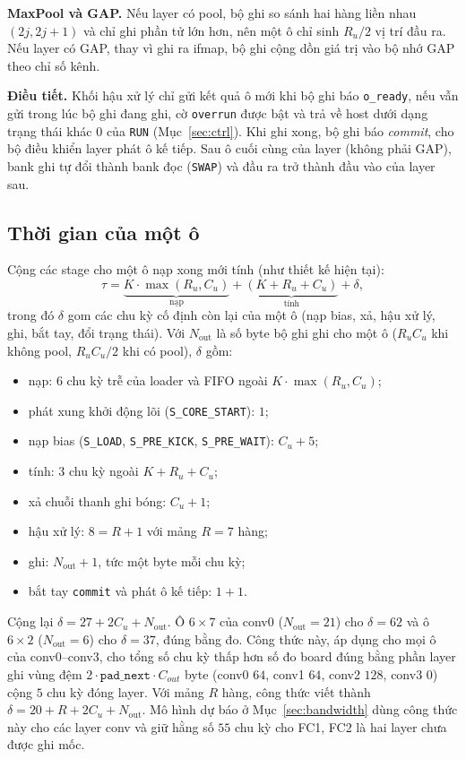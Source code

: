 \textbf{MaxPool và GAP.} Nếu layer có pool, bộ ghi so sánh hai hàng liền nhau $(2j,2j+1)$ và chỉ ghi phần tử lớn hơn, nên một ô chỉ sinh $R_u/2$ vị trí đầu ra.
Nếu layer có GAP, thay vì ghi ra ifmap, bộ ghi cộng dồn giá trị vào bộ nhớ GAP theo chỉ số kênh.

\textbf{Điều tiết.} Khối hậu xử lý chỉ gửi kết quả ô mới khi bộ ghi báo \texttt{o\_ready}, nếu vẫn gửi trong lúc bộ ghi đang ghi, cờ \texttt{overrun} được bật và trả về host dưới dạng trạng thái khác $0$ của \texttt{RUN} (Mục~\ref{sec:ctrl}).
Khi ghi xong, bộ ghi báo \emph{commit}, cho bộ điều khiển layer phát ô kế tiếp.
Sau ô cuối cùng của layer (không phải GAP), bank ghi tự đổi thành bank đọc (\texttt{SWAP}) và đầu ra trở thành đầu vào của layer sau.

\subsection{Thời gian của một ô}
Cộng các stage cho một ô nạp xong mới tính (như thiết kế hiện tại):
\begin{equation}\label{eq:otile}
  \tau=\underbrace{K\cdot\max(R_u,C_u)}_{\text{nạp}}+\underbrace{(K+R_u+C_u)}_{\text{tính}}+\delta,
\end{equation}
trong đó $\delta$ gom các chu kỳ cố định còn lại của một ô (nạp bias, xả, hậu xử lý, ghi, bắt tay, đổi trạng thái).
Với $N_{\text{out}}$ là số byte bộ ghi ghi cho một ô ($R_uC_u$ khi không pool, $R_uC_u/2$ khi có pool), $\delta$ gồm:
\begin{itemize}
  \item nạp: $6$ chu kỳ trễ của loader và FIFO ngoài $K\cdot\max(R_u,C_u)$;
  \item phát xung khởi động lõi (\texttt{S\_CORE\_START}): $1$;
  \item nạp bias (\texttt{S\_LOAD}, \texttt{S\_PRE\_KICK}, \texttt{S\_PRE\_WAIT}): $C_u+5$;
  \item tính: $3$ chu kỳ ngoài $K+R_u+C_u$;
  \item xả chuỗi thanh ghi bóng: $C_u+1$;
  \item hậu xử lý: $8=R+1$ với mảng $R=7$ hàng;
  \item ghi: $N_{\text{out}}+1$, tức một byte mỗi chu kỳ;
  \item bắt tay \texttt{commit} và phát ô kế tiếp: $1+1$.
\end{itemize}
Cộng lại $\delta=27+2C_u+N_{\text{out}}$.
Ô $6\times7$ của conv0 ($N_{\text{out}}=21$) cho $\delta=62$ và ô $6\times2$ ($N_{\text{out}}=6$) cho $\delta=37$, đúng bằng đo.
Công thức này, áp dụng cho mọi ô của conv0--conv3, cho tổng số chu kỳ thấp hơn số đo board đúng bằng phần layer ghi vùng đệm $2\cdot\texttt{pad\_next}\cdot C_{out}$ byte (conv0 $64$, conv1 $64$, conv2 $128$, conv3 $0$) cộng $5$ chu kỳ đóng layer.
Với mảng $R$ hàng, công thức viết thành $\delta=20+R+2C_u+N_{\text{out}}$.
Mô hình dự báo ở Mục~\ref{sec:bandwidth} dùng công thức này cho các layer conv và giữ hằng số $55$ chu kỳ cho FC1, FC2 là hai layer chưa được ghi mốc.
